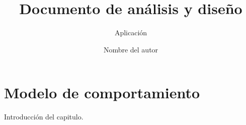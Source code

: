 \documentclass[oneside,10pt]{book}
\title{Documento de análisis y diseño}
\subtitle{Aplicación}
\author{Nombre del autor}
\begin{document}
\maketitle
\frontmatter
\tableofcontents
\mainmatter

\chapter{Modelo de comportamiento}
Introducción del capitulo. 

\end{document}
